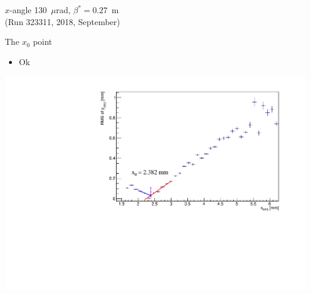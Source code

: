 \documentclass{beamer}
\begin{document}
\begin{frame}
	\begin{center}
	\Large
	$x$-angle 130~$\mu$rad, $\beta^{*}=0.27$~m \\ {\small (Run 323311, 2018, September)}
	\end{center}
\end{frame}

\begin{frame}\scriptsize
	\begin{block}{The $x_{0}$ point}
    		\begin{itemize}
			\item Ok
		\end{itemize}
             \includegraphics[width=1.0\textwidth]{Run_323311_130_murad_beta_star_0p27_m/min.pdf}\\
	\end{block}
	
\end{frame}
\end{document}
